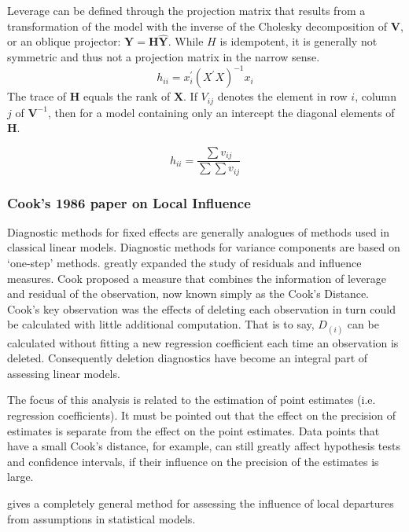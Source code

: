 \documentclass[12pt, a4paper]{report}
\theoremstyle{plain}
\theoremstyle{definition}
\theoremstyle{remark}
\begin{document}
	

	
	Leverage can be defined through the projection matrix that results from a transformation of the model with the inverse of the Cholesky decomposition of $\boldsymbol{V}$, or an oblique projector:	$\boldsymbol{Y} = \boldsymbol{H}\boldsymbol{\hat{Y}}$.
	While $H$ is idempotent, it is generally not symmetric and thus not a projection matrix in the narrow sense.
	\[ h_{ii} = x^{\prime}_{i}(X^{\prime}X)^{-1}x_{i} \]
	The trace of $\boldsymbol{H}$ equals the rank of $\boldsymbol{X}$.
	If $V_{ij}$ denotes the element in row $i$, column $j$ of $\boldsymbol{V}^{-1}$, then for a model containing only an intercept the diagonal elements of $\boldsymbol{H}$.
	
	\[ h_{ii} = \frac{\sum v_{ij}}{\sum \sum v_{ij}} \]
	
	
\subsubsection{Cook's 1986 paper on Local Influence}%
	
Diagnostic methods for fixed effects are generally analogues of methods used in classical linear models.
Diagnostic methods for variance components are based on `one-step' methods.	\citet{cook77} greatly expanded the study of residuals and influence measures. Cook proposed a measure that combines the information of leverage and residual of the observation, now known simply as the Cook's Distance.
Cook's key observation was the effects of deleting each observation in turn could be calculated with little additional computation. That is to say, $D_{(i)}$ can be calculated without fitting a new regression coefficient each time an observation is deleted. Consequently deletion diagnostics have become an integral part of assessing linear models.

The focus of this analysis is related to the estimation of point estimates (i.e. regression coefficients). It must be pointed out that the effect on the precision of estimates is separate from the effect on the point estimates. Data points that have a small Cook's distance, for example, can still greatly affect hypothesis tests and confidence intervals, if their  influence on the precision of the estimates is large.	
	
\citet{cook86} gives a completely general method for assessing the influence of local departures from assumptions in statistical models.
\end{document}
